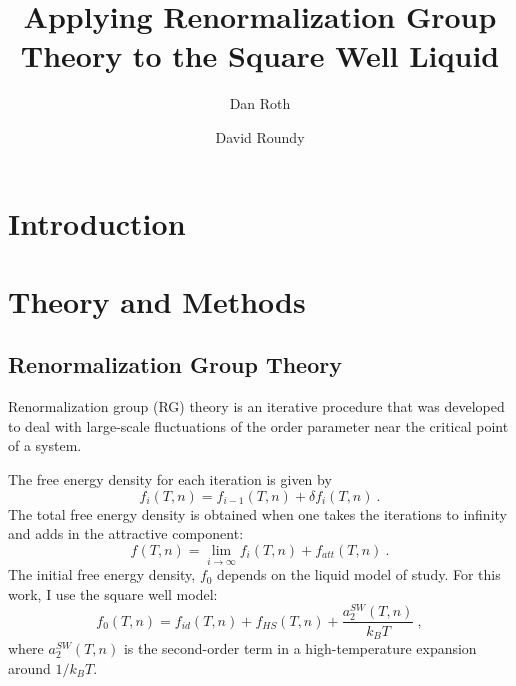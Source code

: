 \documentclass[letterpaper,twocolumn,amsmath,amssymb,prb]{revtex4-1}
\newcommand{\kT}{k_BT}
\begin{document}
\title{Applying Renormalization Group Theory to the Square Well Liquid}

\author{Dan Roth}

\author{David Roundy}

\begin{abstract}
{}

\end{abstract}

\maketitle

\section{Introduction}

\section{Theory and Methods}

\subsection{Renormalization Group Theory}
Renormalization group (RG) theory is an iterative procedure that was
developed to deal with large-scale fluctuations of the order parameter
near the critical point of a system.

The free energy density for each iteration is given by
\begin{equation}
  f_i(T,n) = f_{i-1}(T,n) + \delta f_i(T,n)\ .
\end{equation}
The total free energy density is obtained when one takes the
iterations to infinity and adds in the attractive component:
\begin{equation}
  f(T,n) = \lim_{i \to \infty} f_i(T,n) + f_{att}(T,n)\ .
\end{equation}
The initial free energy density, $f_0$ depends on the liquid model of study. For this work, I use the square well model:
\begin{equation}
  f_0(T,n) = f_{id}(T,n) + f_{HS}(T,n) + \frac{a_2^{SW}(T,n)}{\kT}\ ,
\end{equation}
where $a_2^{SW}(T,n)$ is the second-order term in a high-temperature expansion around $1/\kT$.~\cite{Gil-Villegas97}
\end{document}
